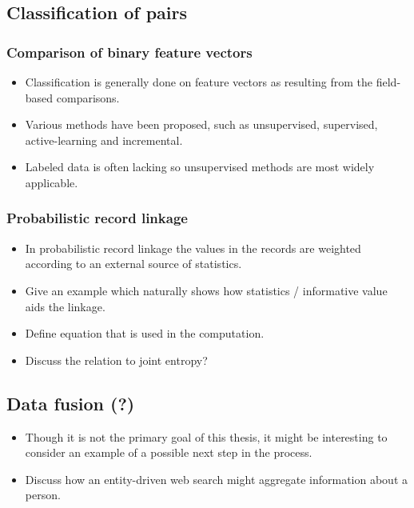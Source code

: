 \documentclass[paper=a4, fontsize=11pt]{scrartcl}
\begin{document}
\subsection{Classification of pairs}

\subsubsection{Comparison of binary feature vectors}
\begin{itemize}
    \item Classification is generally done on feature vectors as resulting from the field-based comparisons.
    \item Various methods have been proposed, such as unsupervised, supervised, active-learning and incremental.
    \item Labeled data is often lacking so unsupervised methods are most widely applicable.
\end{itemize}

\subsubsection{Probabilistic record linkage}
\begin{itemize}
    \item In probabilistic record linkage the values in the records are weighted according to an external source of statistics.
    \item Give an example which naturally shows how statistics / informative value aids the linkage.
    \item Define equation that is used in the computation.
    \item Discuss the relation to joint entropy?
\end{itemize}

\subsection{Data fusion (?)}
\begin{itemize}
    \item Though it is not the primary goal of this thesis, it might be interesting to consider an example of a possible next step in the process.
    \item Discuss how an entity-driven web search might aggregate information about a person.
\end{itemize}


\end{document}
